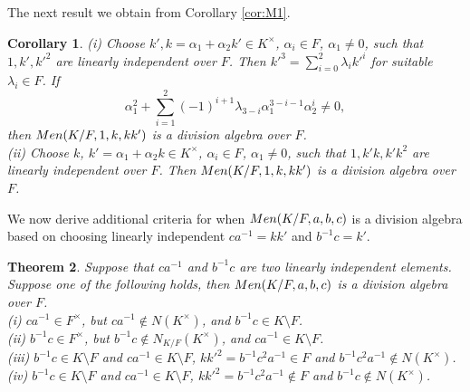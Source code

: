 \documentclass[11pt]{amsart}
\theoremstyle{plain}
\newtheorem{theorem}{Theorem}[section]
\newtheorem{corollary}[theorem]{Corollary}
\theoremstyle{definition}
\begin{document}
The next result we obtain from Corollary \ref{cor:M1}.

 \begin{corollary} \label{cor:M3}
(i) Choose $k',k=\alpha_1+\alpha_2k'\in K^\times$, $\alpha_i\in F$, $\alpha_1\not=0$, such that $1,k',k'^2$ are linearly independent over $F$.
 Then $k'^{3}=\sum_{i=0}^{2}\lambda_i k'^i$ for suitable $\lambda_i\in F$. If
 $$\alpha_1^{2}+\sum_{i=1}^{2} (-1)^{i+1}\lambda_{3-i}\alpha_1^{3-i-1} \alpha_2^{i}\not=0,$$
 then ${\rm Men}(K/F,1,k,kk')$ is a division algebra  over $F$.
 \\ (ii) Choose  $k$, $k'=\alpha_1+\alpha_2k\in K^\times$, $\alpha_i\in F$, $\alpha_1\not=0$, such that $1,k'k,k'k^2$ are linearly independent over $F$. Then ${\rm Men}(K/F,1,k,kk')$ is a division algebra  over $F$.
 \end{corollary}


We now derive additional criteria for when ${\rm Men}(K/F, a,b,c)$ is a division algebra based on choosing linearly independent $ca^{-1}=kk'$ and $b^{-1}c=k'$.

  \begin{theorem}\label{thm:div1}
  Suppose that $ca^{-1}$ and $b^{-1}c $ are two linearly independent elements. Suppose one of the following holds, then  ${\rm Men}(K/F, a,b,c)$ is a division algebra over $F$.
  \\ (i)  $ca^{-1}\in F^\times$, but $c a^{-1} \not\in N(K^\times)$, and $b^{-1}c \in K\setminus F $.
  \\ (ii)  $b^{-1}c\in F^\times$,   but $b^{-1}c\not\in N_{K/F}(K^\times)$, and $ca^{-1} \in K\setminus F$.
  \\ (iii)  $b^{-1}c \in K\setminus F$ and $ca^{-1}\in K\setminus F$,
   $kk'^2=b^{-1}c^2 a^{-1}\in F$ and $b^{-1}c^2 a^{-1} \not\in N(K^\times)$.
\\ (iv)  $b^{-1}c \in K\setminus F$ and $ca^{-1}\in K\setminus F $,
 $kk'^2=b^{-1}c^2 a^{-1}\not \in F$ and $b^{-1}c\not \in  N(K^\times)$.
  \end{theorem}
\end{document}

